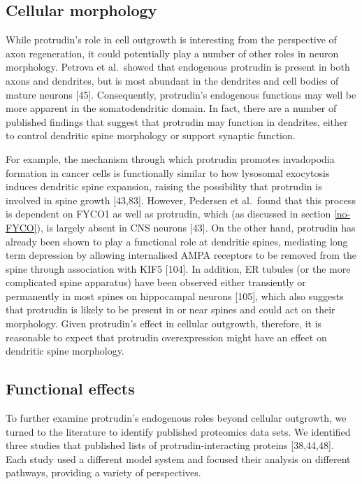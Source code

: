 \documentclass[
  12pt,
  a4paper,
]{book}
\begin{document}
\hypertarget{cellular-morphology}{%
\subsection{Cellular morphology}\label{cellular-morphology}}

While protrudin's role in cell outgrowth is interesting from the perspective of axon regeneration, it could potentially play a number of other roles in neuron morphology. Petrova et al.~showed that endogenous protrudin is present in both axons and dendrites, but is most abundant in the dendrites and cell bodies of mature neurons {[}45{]}. Consequently, protrudin's endogenous functions may well be more apparent in the somatodendritic domain. In fact, there are a number of published findings that suggest that protrudin may function in dendrites, either to control dendritic spine morphology or support synaptic function.

For example, the mechanism through which protrudin promotes invadopodia formation in cancer cells is functionally similar to how lysosomal exocytosis induces dendritic spine expansion, raising the possibility that protrudin is involved in spine growth {[}43,83{]}. However, Pedersen et al.~found that this process is dependent on FYCO1 as well as protrudin, which (as discussed in section \ref{no-FYCO}), is largely absent in CNS neurons {[}43{]}. On the other hand, protrudin has already been shown to play a functional role at dendritic spines, mediating long term depression by allowing internalised AMPA receptors to be removed from the spine through association with KIF5 {[}104{]}. In addition, ER tubules (or the more complicated spine apparatus) have been observed either transiently or permanently in most spines on hippocampal neurons {[}105{]}, which also suggests that protrudin is likely to be present in or near spines and could act on their morphology. Given protrudin's effect in cellular outgrowth, therefore, it is reasonable to expect that protrudin overexpression might have an effect on dendritic spine morphology.

\hypertarget{functional-effects}{%
\subsection{Functional effects}\label{functional-effects}}

To further examine protrudin's endogenous roles beyond cellular outgrowth, we turned to the literature to identify published proteomics data sets. We identified three studies that published lists of protrudin-interacting proteins {[}38,44,48{]}. Each study used a different model system and focused their analysis on different pathways, providing a variety of perspectives.
\end{document}
